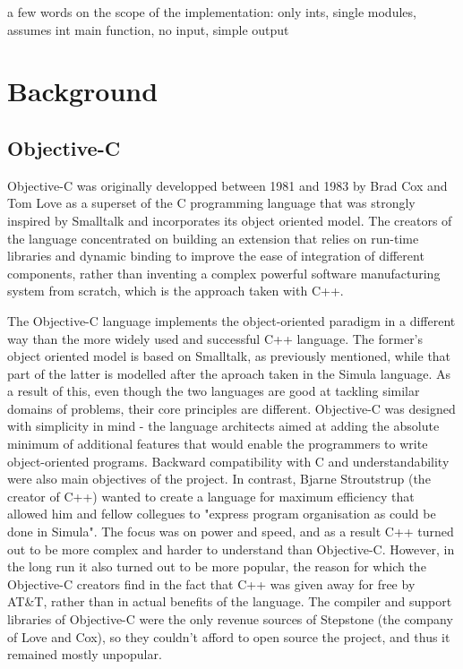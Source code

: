 \documentclass[parskip]{cs4rep}
\begin{document}
a few words on the scope of the implementation: only ints, single modules, assumes int main function, no input, simple output

\chapter{Background}

\section{Objective-C}

Objective-C was originally developped between 1981 and 1983 by Brad Cox and Tom Love as a superset of the C programming language that was strongly inspired by Smalltalk and incorporates its object oriented model\cite{Biancuzzi2009}. The creators of the language concentrated on building an extension that relies on run-time libraries and dynamic binding to improve the ease of integration of different components, rather than inventing a complex powerful software manufacturing system from scratch, which is the approach taken with C++.

The Objective-C language implements the object-oriented paradigm in a different way than the more widely used and successful C++ language. The former's object oriented model is based on Smalltalk, as previously mentioned, while that part of the latter is modelled after the aproach taken in the Simula language. As a result of this, even though the two languages are good at tackling similar domains of problems, their core principles are different. Objective-C was designed with simplicity in mind - the language architects aimed at adding the absolute minimum of additional features that would enable the programmers to write object-oriented programs. Backward compatibility with C and understandability were also main objectives of the project. In contrast, Bjarne Stroutstrup (the creator of C++) wanted to create a language for maximum efficiency that allowed him and fellow collegues to "express program organisation as could be done in Simula"\cite{Biancuzzi2009}. The focus was on power and speed, and as a result C++ turned out to be more complex and harder to understand than Objective-C. However, in the long run it also turned out to be more popular, the reason for which the Objective-C creators find in the fact that C++ was given away for free by AT\&T, rather than in actual benefits of the language. The compiler and support libraries of Objective-C were the only revenue sources of Stepstone (the company of Love and Cox), so they couldn't afford to open source the project, and thus it remained mostly unpopular.
\end{document}
